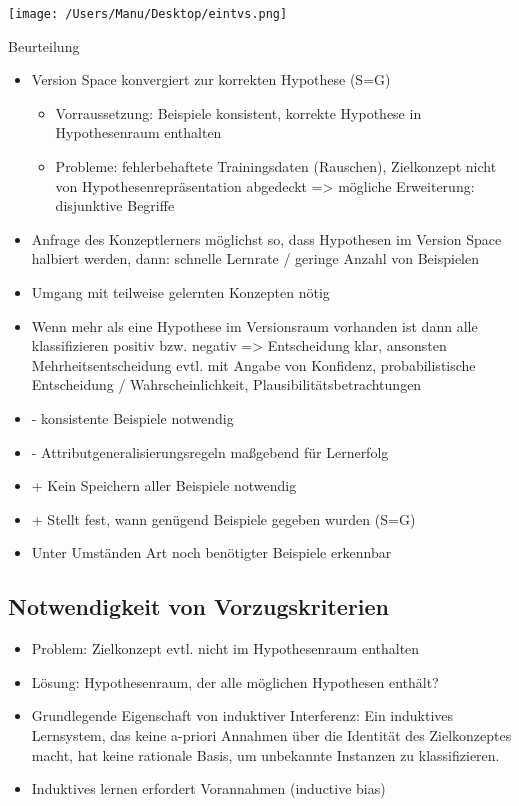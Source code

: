 \documentclass[paper=a4, fontsize=11pt]{scrartcl} %
\numberwithin{equation}{section} %
\numberwithin{figure}{section} %
\numberwithin{table}{section} %
\begin{document}
\texttt{[image: /Users/Manu/Desktop/eintvs.png]}

Beurteilung
\begin{itemize}
\item Version Space konvergiert zur korrekten Hypothese (S=G)
\begin{itemize}
\item Vorraussetzung: Beispiele konsistent, korrekte Hypothese in Hypothesenraum enthalten
\item Probleme: fehlerbehaftete Trainingsdaten (Rauschen), Zielkonzept nicht von Hypothesenrepräsentation abgedeckt => mögliche Erweiterung: disjunktive Begriffe
\end{itemize}
\item Anfrage des Konzeptlerners möglichst so, dass Hypothesen im Version Space halbiert werden, dann: schnelle Lernrate / geringe Anzahl von Beispielen
\item Umgang mit teilweise gelernten Konzepten nötig
\item Wenn mehr als eine Hypothese im Versionsraum vorhanden ist dann alle klassifizieren positiv bzw. negativ => Entscheidung klar, ansonsten Mehrheitsentscheidung evtl. mit Angabe von Konfidenz, probabilistische Entscheidung / Wahrscheinlichkeit, Plausibilitätsbetrachtungen 
\item - konsistente Beispiele notwendig
\item - Attributgeneralisierungsregeln maßgebend für Lernerfolg
\item + Kein Speichern aller Beispiele notwendig
\item + Stellt fest, wann genügend Beispiele gegeben wurden (S=G)
\item Unter Umständen Art noch benötigter Beispiele erkennbar
\end{itemize}

\subsection{Notwendigkeit von Vorzugskriterien}

\begin{itemize}
\item Problem: Zielkonzept evtl. nicht im Hypothesenraum enthalten
\item Lösung: Hypothesenraum, der alle möglichen Hypothesen enthält?
\item Grundlegende Eigenschaft von induktiver Interferenz: Ein induktives Lernsystem, das keine a-priori Annahmen über die Identität des Zielkonzeptes macht, hat keine rationale Basis, um unbekannte Instanzen zu klassifizieren.
\item Induktives lernen erfordert Vorannahmen (inductive bias)
\end{itemize}
\end{document}

